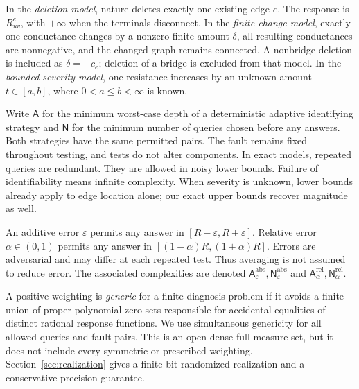 \documentclass[11pt,letterpaper]{article}
\newcommand{\A}{\mathsf A}
\newcommand{\N}{\mathsf N}
\begin{document}
In the \emph{deletion model}, nature deletes exactly one existing edge $e$. The response is $R^e_{uv}$, with $+\infty$ when the terminals disconnect. In the \emph{finite-change model}, exactly one conductance changes by a nonzero finite amount $\delta$, all resulting conductances are nonnegative, and the changed graph remains connected. A nonbridge deletion is included as $\delta=-c_e$; deletion of a bridge is excluded from that model. In the \emph{bounded-severity model}, one resistance increases by an unknown amount $t\in[a,b]$, where $0<a\le b<\infty$ is known.

Write $\A$ for the minimum worst-case depth of a deterministic adaptive identifying strategy and $\N$ for the minimum number of queries chosen before any answers. Both strategies have the same permitted pairs. The fault remains fixed throughout testing, and tests do not alter components. In exact models, repeated queries are redundant. They are allowed in noisy lower bounds. Failure of identifiability means infinite complexity. When severity is unknown, lower bounds already apply to edge location alone; our exact upper bounds recover magnitude as well.

An additive error $\varepsilon$ permits any answer in $[R-\varepsilon,R+\varepsilon]$. Relative error $\alpha\in(0,1)$ permits any answer in $[(1-\alpha)R,(1+\alpha)R]$. Errors are adversarial and may differ at each repeated test. Thus averaging is not assumed to reduce error. The associated complexities are denoted $\A^{\mathrm{abs}}_\varepsilon,\N^{\mathrm{abs}}_\varepsilon$ and $\A^{\mathrm{rel}}_\alpha,\N^{\mathrm{rel}}_\alpha$.

A positive weighting is \emph{generic} for a finite diagnosis problem if it avoids a finite union of proper polynomial zero sets responsible for accidental equalities of distinct rational response functions. We use simultaneous genericity for all allowed queries and fault pairs. This is an open dense full-measure set, but it does not include every symmetric or prescribed weighting. Section~\ref{sec:realization} gives a finite-bit randomized realization and a conservative precision guarantee.
\end{document}
